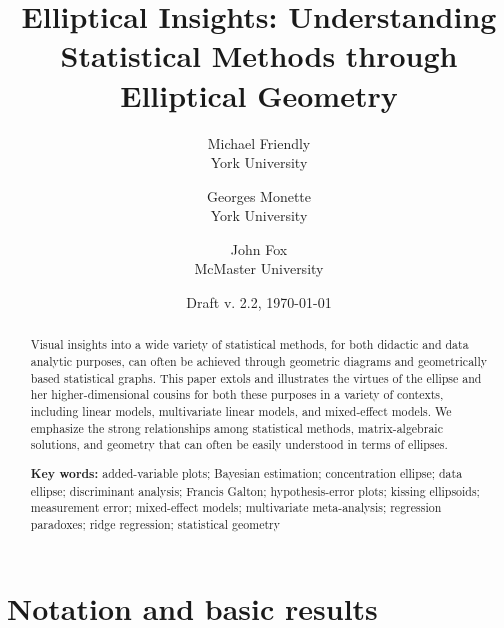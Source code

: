 \documentclass[11pt]{article}%
\newcommand{\keywords}[1]{\par\noindent\textbf{Key words:} #1}
\begin{document}
\begin{titlepage}
\title{Elliptical Insights: Understanding Statistical Methods through Elliptical Geometry}

\author{Michael Friendly%
 \\ York University
\and
Georges Monette \\ York University
\and
John Fox \\ McMaster University
}
\date{Draft v. 2.2, \today}
\end{titlepage}
\maketitle

\begin{abstract}
Visual insights into  a wide variety  of statistical methods,  for both didactic
and data analytic purposes, can often be achieved through geometric diagrams  and
geometrically based statistical graphs.  This  paper extols and illustrates  the
virtues  of  the  ellipse  and her  higher-dimensional  cousins  for  both these
purposes in a variety of contexts, including linear models, multivariate
linear models, and mixed-effect models.
We emphasize the strong relationships among statistical methods, matrix-algebraic
solutions, and geometry that can often be easily understood in terms of
ellipses.

\keywords{
added-variable plots;
Bayesian estimation;
concentration ellipse;
data ellipse;
discriminant analysis;
Francis Galton;
hypothesis-error plots;
kissing ellipsoids;
measurement error;
mixed-effect models;
multivariate meta-analysis;
regression paradoxes;
ridge regression;
statistical geometry
}
\end{abstract}



\section{Notation and basic results}\label{sec:notation}
\end{document}
